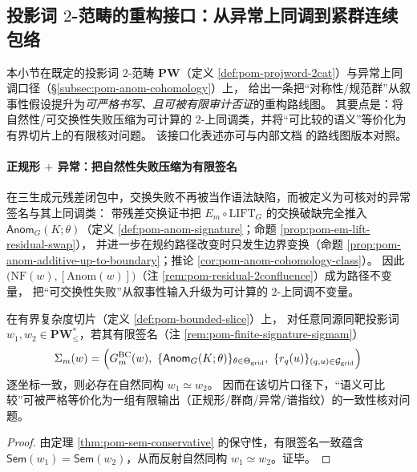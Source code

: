 \subsection{投影词 \texorpdfstring{$2$}{2}-范畴的重构接口：从异常上同调到紧群连续包络}\label{subsec:pom-pw-tannaka-krein-reconstruction}
本小节在既定的投影词 \(2\)-范畴 \(\mathbf{PW}\)（定义 \ref{def:pom-projword-2cat}）与异常上同调口径（\S\ref{subsec:pom-anom-cohomology}）上，
给出一条把“对称性/规范群”从叙事性假设提升为\emph{可严格书写、且可被有限审计否证}的重构路线图。
其要点是：将自然性/可交换性失败压缩为可计算的 \(2\)-上同调类，并将“可比较的语义”等价化为有界切片上的有限核对问题。
该接口化表述亦可与内部文档 \cite{Internal2026PW2CategoryTannakaKreinSM} 的路线图版本对照。

\paragraph{正规形 \texorpdfstring{$+$}{+} 异常：把自然性失败压缩为有限签名}
在三生成元残差闭包中，交换失败不再被当作语法缺陷，而被定义为可核对的异常签名与其上同调类：
带残差交换证书把 \(E_m\circ \mathrm{LIFT}_G\) 的交换破缺完全推入 \(\mathsf{Anom}_G(K;\theta)\)（定义 \ref{def:pom-anom-signature}；命题 \ref{prop:pom-em-lift-residual-swap}），
并进一步在规约路径改变时只发生边界变换（命题 \ref{prop:pom-anom-additive-up-to-boundary}；推论 \ref{cor:pom-anom-cohomology-class}）。
因此 \(\bigl(\mathrm{NF}(w),[\mathrm{Anom}(w)]\bigr)\)（注 \ref{rem:pom-residual-2confluence}）成为路径不变量，
把“可交换性失败”从叙事性输入升级为可计算的 \(2\)-上同调不变量。

\begin{corollary}\label{cor:pom-finite-audit-nf-anom}
在有界复杂度切片（定义 \ref{def:pom-bounded-slice}）上，
对任意同源同靶投影词 \(w_1,w_2\in\mathbf{PW}^{\ast}_{\le}\)，若其有限签名（注 \ref{rem:pom-finite-signature-sigmam}）
\[
\Sigma_m(w)
=
\Bigl(
G^{\mathrm{BC}}_m(w),\
\{\mathsf{Anom}_{G}(K;\theta)\}_{\theta\in\Theta_{\mathrm{grid}}},\
\{r_q(u)\}_{(q,u)\in\mathcal{G}_{\mathrm{grid}}}
\Bigr)
\]
逐坐标一致，则必存在自然同构 \(w_1\simeq w_2\)。
因而在该切片口径下，“语义可比较”可被严格等价化为一组有限输出（正规形/群商/异常/谱指纹）的一致性核对问题。
\end{corollary}
\begin{proof}
由定理 \ref{thm:pom-sem-conservative} 的保守性，有限签名一致蕴含 \(\mathsf{Sem}(w_1)=\mathsf{Sem}(w_2)\)，从而反射自然同构 \(w_1\simeq w_2\)。证毕。
\end{proof}


